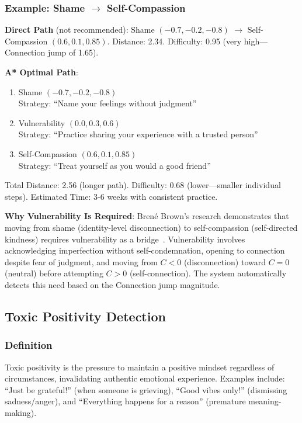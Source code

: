 \subsubsection{Example: Shame $\rightarrow$ Self-Compassion}

\textbf{Direct Path} (not recommended): Shame $(-0.7, -0.2, -0.8)$ $\rightarrow$ Self-Compassion $(0.6, 0.1, 0.85)$. Distance: 2.34. Difficulty: 0.95 (very high—Connection jump of 1.65).

\textbf{A* Optimal Path}:
\begin{enumerate}
    \item Shame $(-0.7, -0.2, -0.8)$\\
    Strategy: ``Name your feelings without judgment''~\cite{linehan2015}

    \item Vulnerability $(0.0, 0.3, 0.6)$\\
    Strategy: ``Practice sharing your experience with a trusted person''~\cite{brown2012}

    \item Self-Compassion $(0.6, 0.1, 0.85)$\\
    Strategy: ``Treat yourself as you would a good friend''~\cite{neff2013}
\end{enumerate}

Total Distance: 2.56 (longer path). Difficulty: 0.68 (lower—smaller individual steps). Estimated Time: 3-6 weeks with consistent practice.

\textbf{Why Vulnerability Is Required}: Brené Brown's research demonstrates that moving from shame (identity-level disconnection) to self-compassion (self-directed kindness) requires vulnerability as a bridge~\cite{brown2012}. Vulnerability involves acknowledging imperfection without self-condemnation, opening to connection despite fear of judgment, and moving from $C < 0$ (disconnection) toward $C = 0$ (neutral) before attempting $C > 0$ (self-connection). The system automatically detects this need based on the Connection jump magnitude.

\subsection{Toxic Positivity Detection}

\subsubsection{Definition}

Toxic positivity is the pressure to maintain a positive mindset regardless of circumstances, invalidating authentic emotional experience. Examples include: ``Just be grateful!'' (when someone is grieving), ``Good vibes only!'' (dismissing sadness/anger), and ``Everything happens for a reason'' (premature meaning-making).

